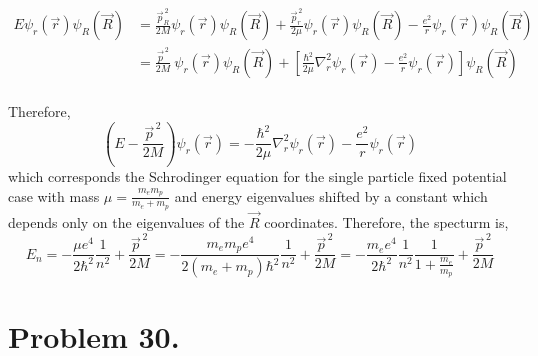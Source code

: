 \documentclass[12pt]{extarticle}
\begin{document}
\begin{align*}
 E \psi_r(\vec{r}) \psi_R(\vec{R}) & = \frac{\vec{p}_R^{\,2}}{2 M} \psi_r(\vec{r}) \psi_R(\vec{R}) + \frac{\vec{p}_r^{\, 2}}{2 \mu} \psi_r(\vec{r}) \psi_R(\vec{R}) - \frac{e^2}{r} \psi_r(\vec{r}) \psi_R(\vec{R}) \\ 
& = \frac{\vec{p}^{\,2}}{2 M} \: \psi_r(\vec{r}) \psi_R(\vec{R}) + \left[ \frac{\hbar^2}{2 \mu} \nabla_r^2 \psi_r(\vec{r}) - \frac{e^2}{r} \psi_r(\vec{r}) \right] \psi_R(\vec{R}) \\ 
\end{align*} 

Therefore,
\[\left(E - \frac{\vec{p}^{\,2}}{2 M} \right) \psi_r(\vec{r}) =  - \frac{\hbar^2}{2 \mu} \nabla_r^2 \psi_r(\vec{r}) - \frac{e^2}{r} \psi_r(\vec{r})  \]
which corresponds the Schrodinger equation for the single particle fixed potential case with mass $\mu = \frac{m_e m_p}{m_e + m_p}$ and energy eigenvalues shifted by a constant which depends only on the eigenvalues of the $\vec{R}$ coordinates. Therefore, the specturm is,
\[E_n = - \frac{\mu e^4}{2 \hbar^2} \frac{1}{n^2} + \frac{\vec{p}^{\,2}}{2 M} = - \frac{m_e m_p e^4}{2 (m_e + m_p) \hbar^2} \frac{1}{n^2} + \frac{\vec{p}^{\,2}}{2 M} = - \frac{m_e e^4}{2 \hbar^2} \frac{1}{n^2} \frac{1}{1 + \frac{m_e}{m_p}} + \frac{\vec{p}^{\,2}}{2 M} \]

\section*{Problem 30.}
\end{document}
